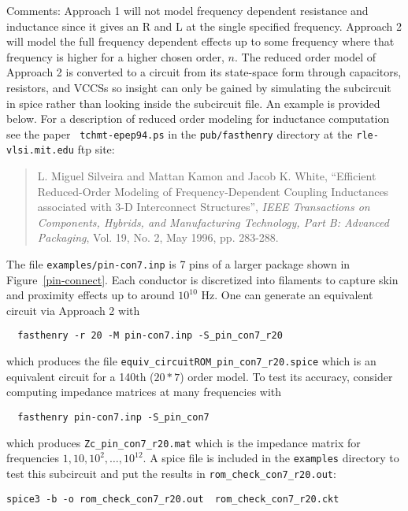 Comments:  Approach 1 will not model frequency dependent resistance
and inductance since it gives an R and L at the single specified
frequency.  Approach 2 will model the full frequency dependent effects
up to some frequency 
where that frequency is higher for a higher chosen order, $n$.
The reduced order model of Approach 2 is converted to a circuit from its
state-space form through capacitors, resistors, and VCCSs so insight
can only be gained by simulating the subcircuit in spice rather than
looking inside the subcircuit file.  An example is provided below. For
a description of reduced 
order modeling for inductance computation see the paper {\tt
tchmt-epep94.ps} in the {\tt pub/fasthenry} directory at
the {\tt rle-vlsi.mit.edu} ftp site:

\begin{quote}
\noindent
 L. Miguel Silveira and Mattan Kamon and Jacob K. White, ``Efficient
 Reduced-Order Modeling of Frequency-Dependent Coupling Inductances
 associated with 3-D Interconnect Structures'', {\em IEEE Transactions on 
    Components, Hybrids, and Manufacturing Technology, Part B:
    Advanced Packaging}, Vol. 19, No. 2, May 1996, pp. 
    283-288. 
\end{quote}


The file {\tt examples/pin-con7.inp} is 7 pins of a larger package
shown in Figure~\ref{pin-connect}. Each conductor is discretized into
filaments to capture skin and proximity effects up to around $10^{10}$
Hz. One can
generate an equivalent circuit via Approach 2 with
\begin{verbatim}
  fasthenry -r 20 -M pin-con7.inp -S_pin_con7_r20
\end{verbatim}
which produces the file {\tt equiv\_circuitROM\_pin\_con7\_r20.spice}
which is an equivalent circuit for a 140th ($20*7$) order model. To test
its accuracy, consider computing impedance matrices at many
frequencies with
\begin{verbatim}
  fasthenry pin-con7.inp -S_pin_con7
\end{verbatim}
which produces {\tt Zc\_pin\_con7\_r20.mat} which is the impedance matrix 
for frequencies $1, 10, 10^2, \ldots, 10^{12}$.  A spice file is
included in the {\tt examples} directory to test this subcircuit and
put the results in {\tt rom\_check\_con7\_r20.out}:
\begin{verbatim}
spice3 -b -o rom_check_con7_r20.out  rom_check_con7_r20.ckt
\end{verbatim}

